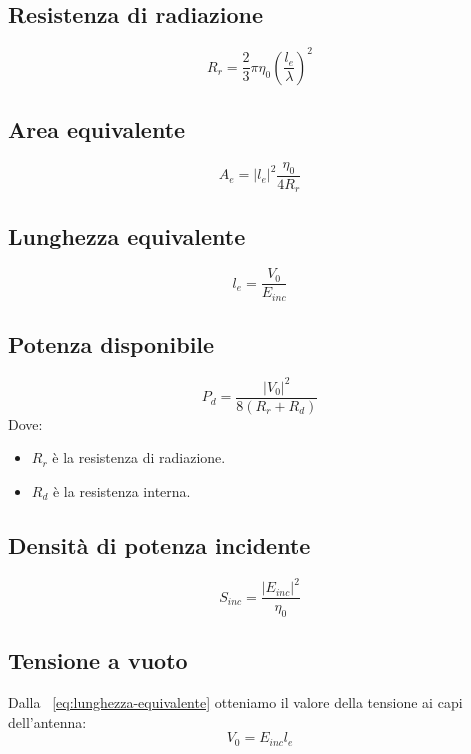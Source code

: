 \documentclass[10pt,a4paper]{report}
\begin{document}
			\subsection{Resistenza di radiazione}			
				\begin{equation}
				R_r=\frac{2}{3}\pi\eta_0(\frac{l_e}{\lambda})^2
				\end{equation}

			\subsection{Area equivalente}			
				\begin{equation}
				A_e=|l_e|^2\frac{\eta_0}{4R_r}
				\end{equation}

			\subsection{Lunghezza equivalente}			
				\begin{equation}
				l_e=\frac{V_0}{E_{inc}}
				\label{eq:lunghezza-equivalente}
				\end{equation}

			\subsection{Potenza disponibile}			
				\begin{equation}
			P_d=\frac{|V_0|^2}{8(R_r+R_d)}
				\end{equation}
			Dove:

			\begin{itemize}
			\item $R_r$ è la resistenza di radiazione.
			\item $R_d$ è la resistenza interna.
			\end{itemize}
			
			\subsection{Densità di potenza incidente}

			\[
			S_{inc}=\frac{|E_{inc}|^2}{\eta_0}	
			\]

			\subsection{Tensione a vuoto}			
				Dalla ~\ref{eq:lunghezza-equivalente} otteniamo il valore della tensione ai capi dell'antenna:
				\begin{equation}
				V_0=E_{inc}l_e
				\end{equation}
\end{document}
